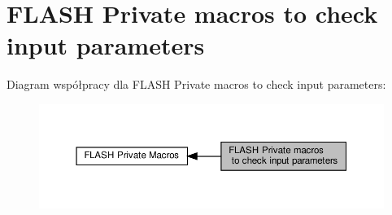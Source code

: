 \hypertarget{group___f_l_a_s_h_ex___i_s___f_l_a_s_h___definitions}{}\section{F\+L\+A\+SH Private macros to check input parameters}
\label{group___f_l_a_s_h_ex___i_s___f_l_a_s_h___definitions}
Diagram współpracy dla F\+L\+A\+SH Private macros to check input parameters\+:\nopagebreak
\begin{figure}[H]
\begin{center}
\leavevmode
\includegraphics[width=350pt]{group___f_l_a_s_h_ex___i_s___f_l_a_s_h___definitions}
\end{center}
\end{figure}
